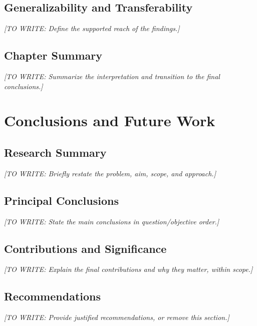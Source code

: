 \documentclass[12pt,a4paper,oneside]{report}
\newif\ifshowguidance
\newcommand{\Guide}[1]{%
  \ifshowguidance
  \begin{tcolorbox}[enhanced,breakable,colback=GuideBlue,
    colframe=GuideBorder,boxrule=0.5pt,arc=1mm,
    title={Writing guide --- replace with your research},
    colbacktitle=ThesisBlue,coltitle=white,fonttitle=\small\bfseries,
    before skip=10pt,after skip=10pt]
    \small #1
  \end{tcolorbox}
  \fi}
\newcommand{\Draft}[1]{\par\noindent\textit{[TO WRITE: #1]}\par}
\begin{document}
\section{Generalizability and Transferability}
\Guide{Define the populations, geometries, operating regimes, contexts,
or settings to which the findings may reasonably apply. State where
additional evidence is needed. For qualitative research, discuss the
contextual detail that supports a reader's assessment of transferability.}
\Draft{Define the supported reach of the findings.}

\section{Chapter Summary}
\Draft{Summarize the interpretation and transition to the final conclusions.}

\chapter{Conclusions and Future Work}
\label{ch:conclusion}
\Guide{Close the argument clearly. Answer the stated problem and questions,
identify the contribution, and acknowledge the most consequential limits.
Do not introduce new experiments, datasets, or results in this chapter.}

\section{Research Summary}
\Draft{Briefly restate the problem, aim, scope, and approach.}

\section{Principal Conclusions}
\Guide{Write concise conclusions supported by results. Map them to the
objectives and research questions. Where useful, include the actual result
magnitude and conditions; avoid copying the abstract or making wider claims.}
\Draft{State the main conclusions in question/objective order.}

\section{Contributions and Significance}
\Draft{Explain the final contributions and why they matter, within scope.}

\section{Recommendations}
\Guide{Include evidence-based recommendations for researchers, practitioners,
or decision-makers only when justified. State the conditions needed for
their use. Omit this section if the thesis does not support recommendations.}
\Draft{Provide justified recommendations, or remove this section.}
\end{document}
